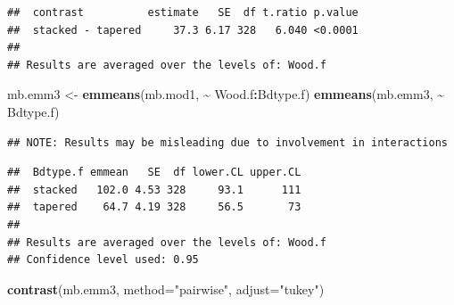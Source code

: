 \documentclass[
]{book}
\newenvironment{Shaded}{\begin{snugshade}}{\end{snugshade}}
\newcommand{\AttributeTok}[1]{\textcolor[rgb]{0.13,0.29,0.53}{#1}}
\newcommand{\FunctionTok}[1]{\textcolor[rgb]{0.13,0.29,0.53}{\textbf{#1}}}
\newcommand{\NormalTok}[1]{#1}
\newcommand{\OtherTok}[1]{\textcolor[rgb]{0.56,0.35,0.01}{#1}}
\newcommand{\SpecialCharTok}[1]{\textcolor[rgb]{0.81,0.36,0.00}{\textbf{#1}}}
\newcommand{\StringTok}[1]{\textcolor[rgb]{0.31,0.60,0.02}{#1}}
\begin{document}
\begin{verbatim}
##  contrast          estimate   SE  df t.ratio p.value
##  stacked - tapered     37.3 6.17 328   6.040 <0.0001
## 
## Results are averaged over the levels of: Wood.f
\end{verbatim}

\begin{Shaded}
\begin{Highlighting}[]
\NormalTok{mb.emm3 }\OtherTok{\textless{}{-}} \FunctionTok{emmeans}\NormalTok{(mb.mod1, }\SpecialCharTok{\textasciitilde{}}\NormalTok{ Wood.f}\SpecialCharTok{:}\NormalTok{Bdtype.f)}
\FunctionTok{emmeans}\NormalTok{(mb.emm3, }\SpecialCharTok{\textasciitilde{}}\NormalTok{ Bdtype.f)}
\end{Highlighting}
\end{Shaded}

\begin{verbatim}
## NOTE: Results may be misleading due to involvement in interactions
\end{verbatim}

\begin{verbatim}
##  Bdtype.f emmean   SE  df lower.CL upper.CL
##  stacked   102.0 4.53 328     93.1      111
##  tapered    64.7 4.19 328     56.5       73
## 
## Results are averaged over the levels of: Wood.f 
## Confidence level used: 0.95
\end{verbatim}

\begin{Shaded}
\begin{Highlighting}[]
\FunctionTok{contrast}\NormalTok{(mb.emm3, }\AttributeTok{method=}\StringTok{"pairwise"}\NormalTok{, }\AttributeTok{adjust=}\StringTok{"tukey"}\NormalTok{)}
\end{Highlighting}
\end{Shaded}
\end{document}
